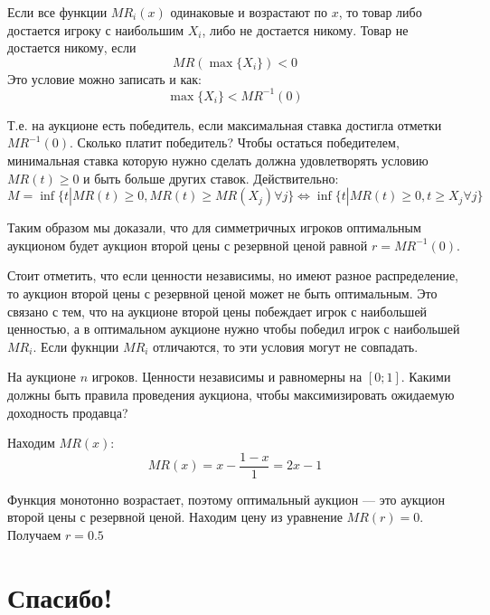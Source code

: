 \begin{myex} Если все функции $ MR_{i}(x) $ одинаковые и возрастают по $ x $, то товар либо достается игроку с наибольшим $ X_{i} $, либо не достается никому. Товар не достается никому, если
\begin{equation}
MR(\max\{X_{i}\})<0
\end{equation}
Это условие можно записать и как:
\begin{equation}
\max\{X_{i}\}<MR^{-1}(0)
\end{equation}

Т.е. на аукционе есть победитель, если максимальная ставка достигла отметки $ MR^{-1}(0) $. Сколько платит победитель? Чтобы остаться победителем, минимальная ставка которую нужно сделать должна удовлетворять условию $ MR(t)\geq 0 $ и быть больше других ставок. Действительно:
\begin{equation}
M=\inf\{ t| MR(t)\geq 0 , MR(t)\geq MR(X_{j}) \forall j \} \Longleftrightarrow \inf\{ t| MR(t)\geq 0 , t\geq X_{j} \forall j \}
\end{equation}

Таким образом мы доказали, что для симметричных игроков оптимальным аукционом будет аукцион второй цены с резервной ценой равной $ r=MR^{-1}(0) $.
\end{myex}


Стоит отметить, что если ценности независимы, но имеют разное распределение, то аукцион второй цены с резервной ценой может не быть оптимальным. Это связано с тем, что на аукционе второй цены побеждает игрок с наибольшей ценностью, а в оптимальном аукционе нужно чтобы победил игрок с наибольшей $ MR_{i} $. Если фукнции $ MR_{i} $ отличаются, то эти условия могут не совпадать.

\begin{myex} На аукционе $ n $ игроков. Ценности независимы и равномерны на $ [0;1] $. Какими должны быть правила проведения аукциона, чтобы максимизировать ожидаемую доходность продавца?

Находим $ MR(x)$:
\begin{equation}
MR(x)=x-\frac{1-x}{1}=2x-1
\end{equation}

Функция монотонно возрастает, поэтому оптимальный аукцион --- это аукцион второй цены с резервной ценой. Находим цену из уравнение $ MR(r)=0 $. Получаем $ r=0.5 $
\end{myex}




\section{Спасибо!}

